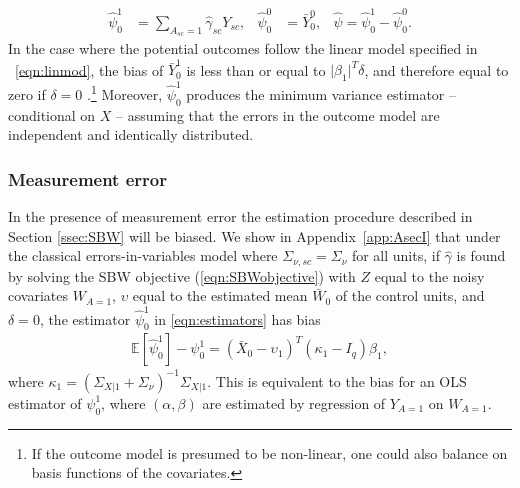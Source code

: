 \documentclass[aoas]{imsart}
\theoremstyle{plain}
\theoremstyle{remark}
\begin{document}
\begin{align}\label{eqn:estimators}
\hat{\psi}_0^1 &= \sum_{A_{sc}=1} \hat{\gamma}_{sc} Y_{sc}, & \hat{\psi}_0^0 & = \bar{Y}_0^0, & \hat{\psi} = \hat{\psi}_0^1 - \hat{\psi}_0^0.
\end{align}
%
In the case where the potential outcomes follow the linear model specified in ~\eqref{eqn:linmod}, the bias of $\bar{Y}^1_0$ is less than or equal to $\lvert\beta_1\rvert^T\delta$, and therefore equal to zero if $\delta = 0$ \citep{zubizarreta2015stable}.\footnote{If the outcome model is presumed to be non-linear, one could also balance on basis functions of the covariates.} Moreover, $\hat{\psi}_0^1$ produces the minimum variance estimator -- conditional on $X$ -- assuming that the errors in the outcome model are independent and identically distributed.

\subsubsection{Measurement error}\label{ssec:methodsmsrment} 

In the presence of measurement error the estimation procedure described in Section \ref{ssec:SBW} will be biased. We show in Appendix~\ref{app:AsecI} that under the classical errors-in-variables model where $\Sigma_{\nu,sc} = \Sigma_{\nu}$ for all units, if $\hat{\gamma}$ is found by solving the SBW objective (\ref{eqn:SBWobjective}) with $Z$ equal to the noisy covariates $W_{A=1}$, $\upsilon$ equal to the estimated mean $\bar{W}_0$ of the control units, and $\delta=0$, the estimator $\hat{\psi}_0^1$ in \eqref{eqn:estimators} has bias
\begin{align*}
\mathbb{E}[\hat{\psi}_0^1] - \psi_0^1 = (\bar{X}_0 - \upsilon_1)^T(\kappa_1 - I_q)\beta_1,  
\end{align*}
where $\kappa_1 = (\Sigma_{X|1} + \Sigma_{\nu})^{-1}\Sigma_{X|1}$. This is equivalent to the bias for an OLS estimator of $\psi_0^1$, where $(\alpha, \beta)$ are estimated by regression of $Y_{A=1}$ on $W_{A=1}$.
\end{document}
